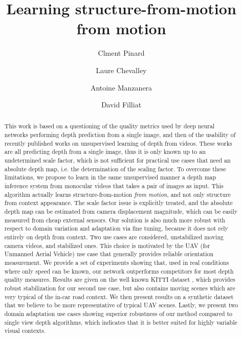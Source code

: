 \documentclass[runningheads]{llncs}
\title{Learning
structure-from-motion
from motion}
\author{Clment Pinard\inst{1,2} \and Laure Chevalley\inst{2} \and Antoine Manzanera\inst{1} \and David Filliat\inst{1}
}
\institute{
ENSTA ParisTech \\
Computer Science and System Engineering Department\\
Palaiseau, France\\
\email{\{clement.pinard, antoine.manzanera, david.filliat\}@ensta-parsitech.fr}
\and
Parrot,
Paris, France\\
\email{laure.chevalley@parrot.com}
}
\begin{document}
\maketitle

\begin{abstract}
This work is based on a questioning of the quality metrics used by deep neural networks performing depth prediction from a single image, and then of the usability
of recently published works on unsupervised learning of depth from videos. These works are all predicting depth from a single image, thus it is only known up to an undetermined scale factor,
which is not sufficient for practical
use cases that need an absolute depth map, i.e. the determination of the scaling factor.
To overcome these limitations, we propose to learn in the same unsupervised manner a depth map inference system from monocular videos that takes a pair of images as input. This algorithm
actually
learns
structure-from-motion {\em from motion}, and not only structure from context appearance.
The scale factor issue is explicitly treated, and the absolute
depth map
can be estimated from camera displacement magnitude, which can be easily measured from cheap external sensors. Our solution is also
much more robust with respect to
domain variation and adaptation via
fine tuning,
because it does not rely entirely on depth from context. Two
use cases
are considered,
unstabilized moving camera videos,
and stabilized ones. This choice is motivated by the UAV (for Unmanned Aerial Vehicle)
use case
that generally provides reliable orientation measurement. We provide a set of experiments
showing that, used
in real conditions where only speed can be known, our network outperforms competitors for most depth quality measures. Results are given on the well known KITTI dataset \cite{geiger2013vision}, which provides robust stabilization for our second
use case,
but
also
contains moving scenes which are
very typical of the in-car road context. We then present results on a synthetic dataset that we believe to be more representative of typical UAV scenes. Lastly, we present two domain adaptation use cases showing superior robustness of our method compared to single view depth algorithms,
which indicates that
it is better suited for
highly variable visual contexts.
\end{abstract}
\end{document}
